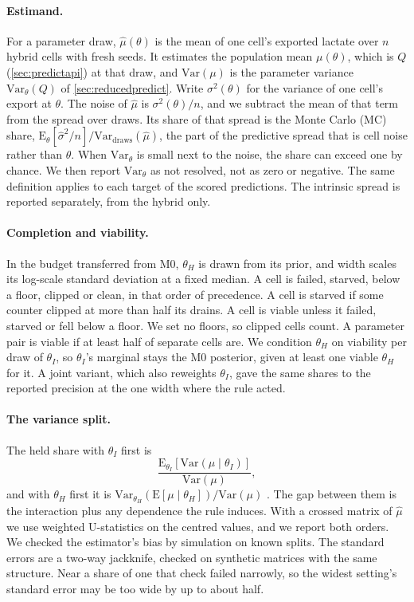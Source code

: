 \paragraph{Estimand.} For a parameter draw, $\hat\mu(\theta)$ is the mean of one cell's
exported lactate over $n$ hybrid cells with fresh seeds. It estimates the population mean
$\mu(\theta)$, which is $Q$ (\cref{sec:predictapi}) at that draw, and $\mathrm{Var}(\mu)$ is
the parameter variance $\mathrm{Var}_\theta(Q)$ of \cref{sec:reducedpredict}. Write $\sigma^2(\theta)$ for the variance of one cell's export at
$\theta$. The noise of $\hat\mu$ is $\sigma^2(\theta)/n$, and we subtract the
mean of that term from the spread over draws. Its share of that spread is the Monte Carlo
(MC) share, $\mathrm{E}_\theta[\hat\sigma^2/n] / \mathrm{Var}_{\mathrm{draws}}(\hat\mu)$,
the part of the predictive spread that is cell noise rather than $\theta$. When
$\mathrm{Var}_\theta$ is small next to the noise, the share can exceed one by chance. We
then report $\mathrm{Var}_\theta$ as not resolved, not as zero or negative. The same
definition applies to each target of the scored predictions. The intrinsic spread is reported
separately, from the hybrid only.

\paragraph{Completion and viability.} In the budget transferred from M0, $\theta_H$ is drawn from its
prior, and width scales its log-scale standard deviation at a fixed median. A cell is
failed, starved, below a floor, clipped or clean, in that order of precedence. A cell
is starved if some counter clipped at more than half its drains. A cell is viable unless it failed, starved or fell below a floor. We set no floors, so clipped cells count. A parameter pair is viable if at least half of  separate cells are. We condition $\theta_H$ on viability per draw of $\theta_I$, so
$\theta_I$'s marginal stays the M0 posterior, given at least one viable $\theta_H$ for it.
A joint variant, which also reweights $\theta_I$, gave the same shares to the reported precision at the one width where the rule acted.

\paragraph{The variance split.} The held share with $\theta_I$ first is \begin{equation} \frac{\mathrm{E}_{\theta_I}\!\left[\mathrm{Var}(\mu \mid \theta_I)\right]}{\mathrm{Var}(\mu)} , \end{equation} and with $\theta_H$ first it is $\mathrm{Var}_{\theta_H}(\mathrm{E}[\mu \mid \theta_H]) / \mathrm{Var}(\mu)$ \cite{saltelli2010variance}. The gap between them is the interaction plus any dependence the rule induces. With a crossed matrix of $\hat\mu$ we use weighted U-statistics on the centred values, and we report both orders. We checked the
estimator's bias by simulation on known splits. The standard errors are a two-way
jackknife, checked on synthetic matrices with the same structure. Near a share of one that
check failed narrowly, so the widest setting's standard error may be too wide by up to
about half.

